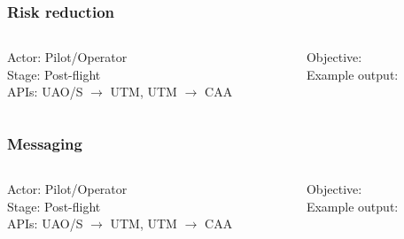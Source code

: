 \documentclass[usenames,dvipsnames,aspectratio=169,serif]{beamer}
\begin{document}
\begin{frame}
   \frametitle{Risk reduction}
   \begin{columns}[t]
      \begin{column}{0.5\textwidth}
         Actor: Pilot/Operator \\
         Stage: Post-flight \\
         APIs: UAO/S $\rightarrow$ UTM, UTM $\rightarrow$ CAA \\
      \end{column}
      \begin{column}{0.5\textwidth}
         Objective: \\
         Example output: \\
      \end{column}
   \end{columns}
\end{frame}

\begin{frame}
   \frametitle{Messaging}
   \begin{columns}[t]
      \begin{column}{0.5\textwidth}
         Actor: Pilot/Operator \\
         Stage: Post-flight \\
         APIs: UAO/S $\rightarrow$ UTM, UTM $\rightarrow$ CAA \\
      \end{column}
      \begin{column}{0.5\textwidth}
         Objective: \\
         Example output: \\
      \end{column}
   \end{columns}
\end{frame}
\end{document}
